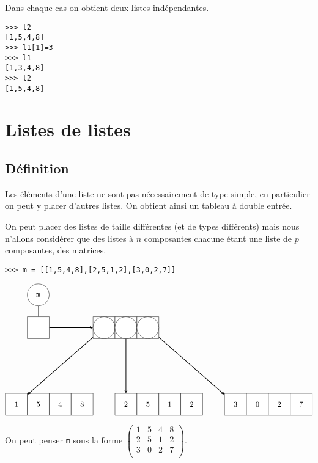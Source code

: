 Dans chaque cas on obtient deux listes indépendantes.

\begin{lstlisting}
>>> l2
[1,5,4,8]
>>> l1[1]=3
>>> l1
[1,3,4,8]
>>> l2
[1,5,4,8]
\end{lstlisting}


\section{Listes de listes}

\subsection{Définition}

Les éléments d'une liste ne sont pas nécessairement de type simple, en particulier on peut y placer d'autres listes. On obtient ainsi un tableau à double entrée.

On peut placer des listes de taille différentes (et de types différents) mais nous n'allons considérer que des listes à $n$ composantes chacune étant une liste de $p$ composantes, des matrices.

\begin{lstlisting}
>>> m = [[1,5,4,8],[2,5,1,2],[3,0,2,7]]
\end{lstlisting}

$$\tikzpicture
 \tikzstyle{every node}=[draw,minimum size =10mm,fill=white]
 \node[circle] (m) {\tt m}
  child {node[rectangle](l){}};
 \node[rectangle](l0) at (3,-1.5) {};
 \node[circle](ll0) at (3,-1.5) {};
 \node[rectangle](l1) at (4,-1.5) {};
 \node[circle](ll1) at (4,-1.5) {};
 \node[rectangle](l2) at (5,-1.5) {};
 \node[circle](ll2) at (5,-1.5) {};
 \draw [thick,-stealth] (l) -- (l0);
 \node[rectangle](m20) at (9,-5) {3};
 \node[rectangle](m21) at (10,-5) {0};
 \node[rectangle](m22) at (11,-5) {2};
 \node[rectangle](m23) at (12,-5) {7};
 \draw [thick,-stealth] (l2) -- (m20);
 \node[rectangle](m10) at (4,-5) {2};
 \node[rectangle](m11) at (5,-5) {5};
 \node[rectangle](m12) at (6,-5) {1};
 \node[rectangle](m13) at (7,-5) {2};
 \draw [thick,-stealth] (l1) -- (m10);
 \node[rectangle](m00) at (-1,-5) {1};
 \node[rectangle](m01) at (0,-5) {5};
 \node[rectangle](m02) at (1,-5) {4};
 \node[rectangle](m03) at (2,-5) {8};
 \draw [thick,-stealth] (l0) -- (m00);
\endtikzpicture$$



\vskip 1cm

On peut penser \lstinline?m? sous la forme
$\begin{pmatrix}
1&5&4&8\\ 
2&5&1&2\\ 
3&0&2&7\\
\end{pmatrix}$.

